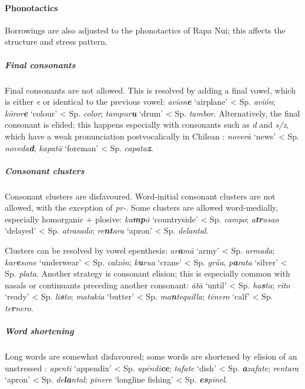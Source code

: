 \paragraph{Phonotactics} Borrowings are also adjusted to the phonotactics of Rapa Nui; this affects the  structure and stress pattern. 

\subparagraph{Final consonants} Final consonants are not allowed. This is resolved by adding a final vowel, which is either \textit{e} or identical to the previous vowel: \textit{{\ꞌ}avion\textbf{e}} ‘airplane’ {\textless} Sp. \textit{avión}; \textit{kōror\textbf{e}} ‘colour’ {\textless} Sp. \textit{color}; \textit{tampur\textbf{u}} ‘drum’ {\textless} Sp. \textit{tambor}. Alternatively, the final consonant is elided; this happens especially with consonants such as \textit{d} and \textit{s/z}, which have a weak pronunciation postvocalically in Chilean : \textit{noverā} ‘news’ {\textless} Sp. \textit{noveda\textbf{d}}; \textit{kapatā} ‘foreman’ {\textless} Sp. \textit{capata\textbf{z}}.

\subparagraph{Consonant clusters} Consonant clusters are disfavoured. Word-initial consonant clusters are not allowed, with the exception of \textit{pr-}. Some clusters are allowed word-medially, especially homorganic  + plosive: \textit{ka\textbf{mp}ō} ‘countryside’ {\textless} Sp. \textit{campo}; \textit{a\textbf{tr}asao} ‘delayed’ {\textless} Sp. \textit{atrasado}; \textit{re\textbf{nt}ara} ‘apron’ {\textless} Sp. \textit{delantal}.

Clusters can be resolved by vowel epenthesis: \textit{{\ꞌ}ar\textbf{a}mā} ‘army’ {\textless} Sp. \textit{armada}; \textit{kar\textbf{e}sone} ‘underwear’ {\textless} Sp. \textit{calzón}; \textit{k\textbf{u}rua} ‘crane’ {\textless} Sp. \textit{grúa}, \textit{p\textbf{a}rata} ‘silver’ {\textless} Sp. \textit{plata}. Another strategy is consonant elision; this is especially common with nasals or continuants preceding another consonant: \textit{{\ꞌ}ātā} ‘until’ {\textless} Sp. \textit{ha\textbf{s}ta}; \textit{rito} ‘ready’ {\textless} Sp. \textit{li\textbf{s}to}; \textit{matakia} ‘butter’ {\textless} Sp. \textit{ma\textbf{n}tequilla}; \textit{tēnero} ‘calf’ {\textless} Sp. \textit{te\textbf{r}nero}.

\subparagraph{Word shortening} Long words are somewhat disfavoured; some words are shortened by elision of an unstressed : \textit{apenti} ‘appendix’ {\textless} Sp. \textit{apéndi\textbf{ce}}; \textit{tafate} ‘dish’ {\textless} Sp. \textit{\textbf{a}zafate}; \textit{rentara} ‘apron’ {\textless} Sp. \textit{de\textbf{la}ntal}; \textit{pīnere} ‘longline fishing’ {\textless} Sp. \textit{\textbf{es}pinel}.

